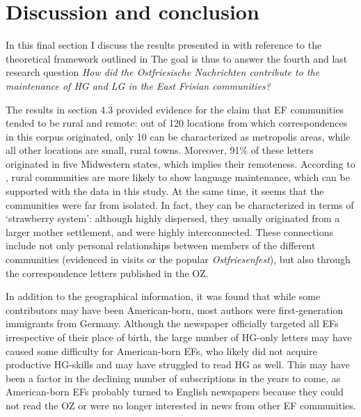 \documentclass[output=paper]{langsci/langscibook}
\begin{document}
\section{Discussion and conclusion} %
\label{sec:rocker:5}
 
In this final section I discuss the results presented in  with reference to the theoretical framework outlined in  The goal is thus to answer the fourth and last research question \textit{How did the Ostfriesische Nachrichten contribute to the maintenance of HG and LG in the East Frisian communities?}
 

 
The results in section 4.3 provided evidence for the claim that EF communities tended to be rural and remote: out of 120 locations from which correspondences in this corpus originated, only 10 can be characterized as metropolis areas, while all other locations are small, rural towns. Moreover, 91\% of these letters originated in five Midwestern states, which implies their remoteness. According to \citet{Louden2006}, rural communities are more likely to show language maintenance, which can be supported with the data in this study. At the same time, it seems that the communities were far from isolated. In fact, they can be characterized in terms of  ‘strawberry system’: although highly dispersed, they usually originated from a larger mother settlement, and were highly interconnected. These connections include not only personal relationships between members of the different communities (evidenced in visits or the popular \textit{Ostfriesenfest}), but also through the correspondence letters published in the OZ. 
 

 
In addition to the geographical information, it was found that while some contributors may have been American-born, most authors were first-generation immigrants from Germany. Although the newspaper officially targeted all EFs irrespective of their place of birth, the large number of HG-only letters may have caused some difficulty for American-born EFs, who likely did not acquire productive HG-skills and may have struggled to read HG as well. This may have been a factor in the declining number of subscriptions in the years to come, as American-born EFs probably turned to English newspapers because they could not read the OZ or were no longer interested in news from other EF communities.
 
\end{document}
